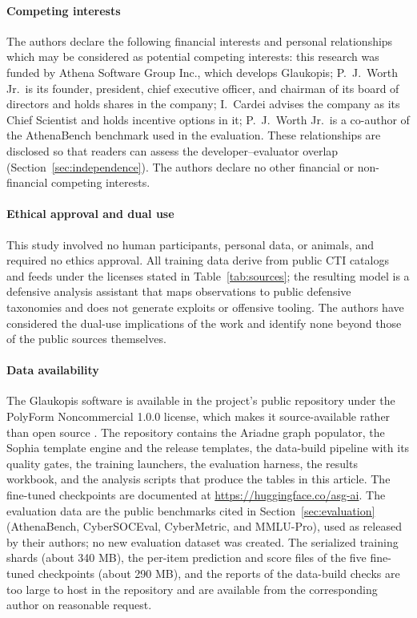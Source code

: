 \documentclass[twocolumn]{svjour3}
\begin{document}
\paragraph{Competing interests}
The authors declare the following financial interests and personal relationships which may be considered as potential competing interests: this research was funded by Athena Software Group Inc., which develops Glaukopis; P.~J.~Worth Jr.\ is its founder, president, chief executive officer, and chairman of its board of directors and holds shares in the company; I.~Cardei advises the company as its Chief Scientist and holds incentive options in it; P.~J.~Worth Jr.\ is a co-author of the AthenaBench benchmark used in the evaluation. These relationships are disclosed so that readers can assess the developer--evaluator overlap (Section~\ref{sec:independence}). The authors declare no other financial or non-financial competing interests.

\paragraph{Ethical approval and dual use}
This study involved no human participants, personal data, or animals, and required no ethics approval. All training data derive from public CTI catalogs and feeds under the licenses stated in Table~\ref{tab:sources}; the resulting model is a defensive analysis assistant that maps observations to public defensive taxonomies and does not generate exploits or offensive tooling. The authors have considered the dual-use implications of the work and identify none beyond those of the public sources themselves.

\paragraph{Data availability}
The Glaukopis software is available in the project's public repository under the PolyForm Noncommercial 1.0.0 license, which makes it source-available rather than open source \cite{glaukopis2026software}. The repository contains the Ariadne graph populator, the Sophia template engine and the release templates, the data-build pipeline with its quality gates, the training launchers, the evaluation harness, the results workbook, and the analysis scripts that produce the tables in this article. The fine-tuned checkpoints are documented at \url{https://huggingface.co/asg-ai}. The evaluation data are the public benchmarks cited in Section~\ref{sec:evaluation} (AthenaBench, CyberSOCEval, CyberMetric, and MMLU-Pro), used as released by their authors; no new evaluation dataset was created. The serialized training shards (about 340 MB), the per-item prediction and score files of the five fine-tuned checkpoints (about 290 MB), and the reports of the data-build checks are too large to host in the repository and are available from the corresponding author on reasonable request.
\end{document}

